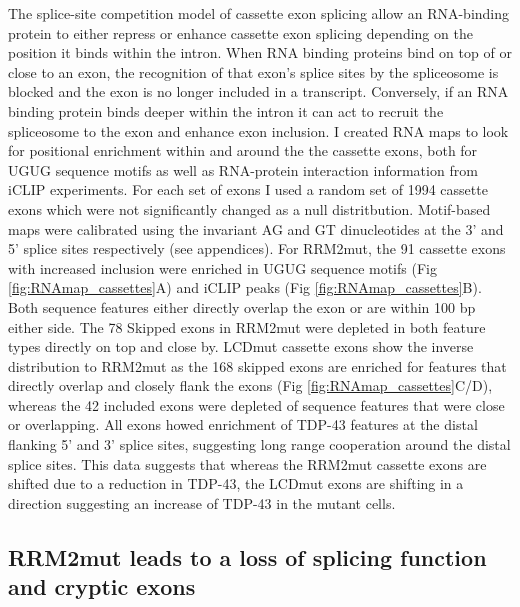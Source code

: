 The splice-site competition model of cassette exon splicing allow an RNA-binding protein to either repress or enhance cassette exon splicing depending on the position it binds within the intron. When RNA binding proteins bind on top of or close to an exon, the recognition of that exon's splice sites by the spliceosome is blocked and the exon is no longer included in a transcript. Conversely, if an RNA binding protein binds deeper within the intron it can act to recruit the spliceosome to the exon and enhance exon inclusion. 
I created RNA maps to look for positional enrichment within and around the the cassette exons, both for UGUG sequence motifs as well as RNA-protein interaction information from iCLIP experiments. For each set of exons I used a random set of 1994 cassette exons which were not significantly changed as a null distritbution.
Motif-based maps were calibrated using the invariant AG and GT dinucleotides at the 3' and 5' splice sites respectively (see appendices).
For RRM2mut, the 91 cassette exons with increased inclusion were enriched in UGUG sequence motifs (Fig \ref{fig:RNAmap_cassettes}A) and iCLIP peaks (Fig \ref{fig:RNAmap_cassettes}B).
Both sequence features either directly overlap the exon or are within 100 bp either side. 
The 78 Skipped exons  in RRM2mut were depleted in both feature types directly on top and close by. 
LCDmut cassette exons show the inverse distribution to RRM2mut as the 168 skipped exons are enriched for features that directly overlap and closely flank the exons (Fig \ref{fig:RNAmap_cassettes}C/D), whereas the 42 included exons were depleted of sequence features that were close or overlapping.
All exons howed enrichment of TDP-43 features at the distal flanking 5' and 3' splice sites, suggesting long range cooperation around the distal splice sites.
This data suggests that whereas the RRM2mut cassette exons are shifted due to a reduction in TDP-43, the LCDmut exons are shifting in a direction suggesting an increase of TDP-43 in the mutant cells.



\subsection{RRM2mut leads to a loss of splicing function and cryptic exons}

